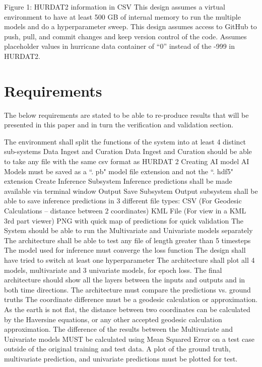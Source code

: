 \documentclass{article}
\begin{document}
Figure 1: HURDAT2 information in CSV
This design assumes a virtual environment to have at least 500 GB of internal memory to run the multiple models and do a hyperparameter sweep.
This design assumes access to GitHub to push, pull, and commit changes and keep version control of the code. 
Assumes placeholder values in hurricane data container of “0” instead of the -999 in HURDAT2.

\section{Requirements}
The below requirements are stated to be able to re-produce results that will be presented in this paper and in turn the verification and validation section.

The environment shall split the functions of the system into at least 4 distinct sub-systems
Data Ingest and Curation
Data Ingest and Curation should be able to take any file with the same csv format as HURDAT 2
Creating AI model
AI Models must be saved as a “. pb" model file extension and not the “. hdf5" extension
Create Inference Subsystem
Inference predictions shall be made available via terminal window
Output Save Subsystem
Output subsystem shall be able to save inference predictions in 3 different file types:
CSV (For Geodesic Calculations – distance between 2 coordinates)
KML File (For view in a KML 3rd part viewer)
PNG with quick map of predictions for quick validation
The System should be able to run the Multivariate and Univariate models separately
The architecture shall be able to test any file of length greater than 5 timesteps
The model used for inference must converge the loss function
The design shall have tried to switch at least one hyperparameter
The architecture shall plot all 4 models, multivariate and 3 univariate models, for epoch loss.
The final architecture should show all the layers between the inputs and outputs and in both time directions.
The architecture must compare the predictions vs. ground truths 
The coordinate difference must be a geodesic calculation or approximation.
As the earth is not flat, the distance between two coordinates can be calculated by the Haversine equations, or any other accepted geodesic calculation approximation.
The difference of the results between the Multivariate and Univariate models MUST be calculated using Mean Squared Error on a test case outside of the original training and test data.
 A plot of the ground truth, multivariate prediction, and univariate predictions must be plotted for test.
\end{document}
